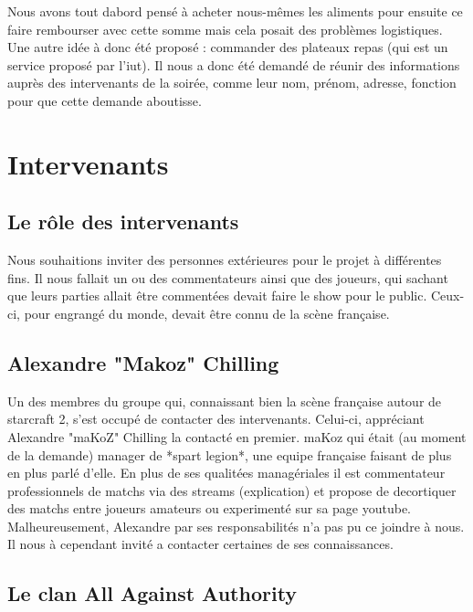 Nous avons tout dabord pensé à acheter nous-mêmes les aliments pour
ensuite ce faire rembourser avec cette somme mais cela posait des
problèmes logistiques. Une autre idée à donc été proposé : commander des
plateaux repas (qui est un service proposé par l'iut). Il nous a donc
été demandé de réunir des informations auprès des intervenants de la
soirée, comme leur nom, prénom, adresse, fonction pour que cette demande
aboutisse.

\section{Intervenants}%
\label{sec:intervenants}

\subsection{Le rôle des intervenants}%
\label{sub:le_role_des_intervenants}

Nous souhaitions inviter des personnes extérieures pour le projet à
différentes fins. Il nous fallait un ou des commentateurs ainsi que des
joueurs, qui sachant que leurs parties allait être commentées devait faire
le show pour le public. Ceux-ci, pour engrangé du monde, devait être
connu de la scène française.

\subsection{Alexandre "Makoz" Chilling}%
\label{sub:alexandre_makoz_chilling}

Un des membres du groupe qui, connaissant bien la scène française autour
de starcraft 2, s'est occupé de contacter des intervenants.  Celui-ci,
appréciant Alexandre "maKoZ" Chilling la contacté en premier.  maKoz qui
était (au moment de la demande) manager de *spart legion*, une equipe
française faisant de plus en plus parlé d'elle. En plus de ses qualitées
managériales il est commentateur professionnels de matchs via des
streams (explication) et propose de decortiquer des matchs entre joueurs
amateurs ou experimenté sur sa page youtube. Malheureusement, Alexandre
par ses responsabilités n'a pas pu ce joindre à nous. Il nous à
cependant invité a contacter certaines de ses connaissances.

\subsection{Le clan All Against Authority}%
\label{sub:le_clan_all_against_authority}

